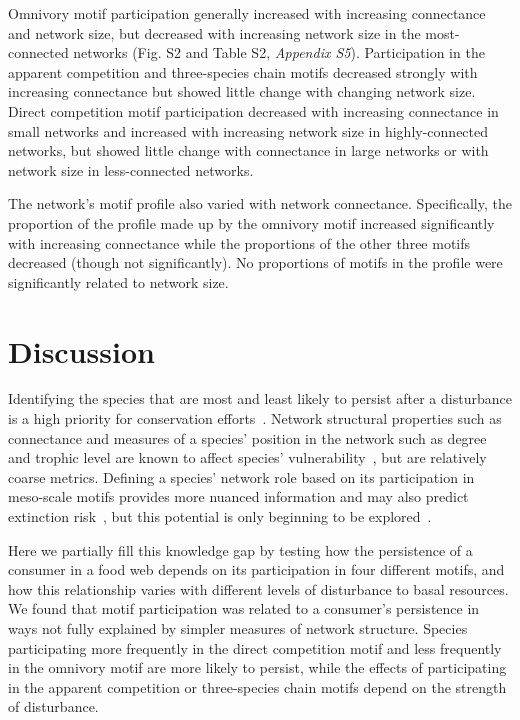 \documentclass[12pt]{article}
\begin{document}
\begin{spacing}{2.0}
        
        Omnivory motif participation generally increased with increasing connectance and network size, but decreased with increasing network size in the most-connected networks (Fig. S2 and Table S2, \emph{Appendix S5}).
        Participation in the apparent competition and three-species chain motifs decreased strongly with increasing connectance but showed little change with changing network size.
        Direct competition motif participation decreased with increasing connectance in small networks and increased with increasing network size in highly-connected networks, but showed little change with connectance in large networks or with network size in less-connected networks.

        
        The network's motif profile also varied with network connectance.
        Specifically, the proportion of the profile made up by the omnivory motif increased significantly  with increasing connectance while the proportions of the other three motifs decreased (though not significantly).
        No proportions of motifs in the profile were significantly related to network size.


\section*{Discussion}

    Identifying the species that are most and least likely to persist after a disturbance is a high priority for conservation efforts~\citep{Bottrilletal2008}. 
    Network structural properties such as connectance and measures of a species' position in the network such as degree and trophic level are known to affect species' vulnerability~\citep{Dunne2002, Eklof2006, PascualDunne2006,prill2005dynamic, bascompte2005simple,curtsdotter2011robustness, dunne2009cascading}, but are relatively coarse metrics.
    Defining a species' network role based on its participation in meso-scale motifs provides more nuanced information and may also predict extinction risk~\citep{Stouffer2007,Stouffer2010b,Simmons2019,Cirtwill2018FoodWebs}, but this potential is only beginning to be explored~\citep{Cirtwill2022Oikos}.

    
    Here we partially fill this knowledge gap by testing how the persistence of a consumer in a food web depends on its participation in four different motifs, and how this relationship varies with different levels of disturbance to basal resources.  
    We found that motif participation was related to a consumer's persistence in ways not fully explained by simpler measures of network structure. 
    Species participating more frequently in the direct competition motif and less frequently in the omnivory motif are more likely to persist, while the effects of participating in the apparent competition or three-species chain motifs depend on the strength of disturbance.



\end{spacing}
\end{document}

